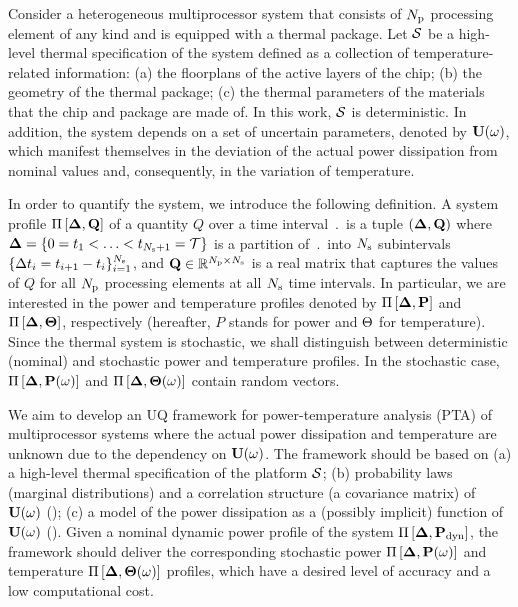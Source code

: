 Consider a heterogeneous multiprocessor system that consists of ${N_\text{p}}$ processing element of any kind and is equipped with a thermal package. Let $\mathcal{S}$ be a high-level thermal specification of the system defined as a collection of temperature-related information: (a) the floorplans of the active layers of the chip; (b) the geometry of the thermal package; (c) the thermal parameters of the materials that the chip and package are made of. In this work, $\mathcal{S}$ is deterministic. In addition, the system depends on a set of uncertain parameters, denoted by $\mathbf{U}(\omega)$, which manifest themselves in the deviation of the actual power dissipation from nominal values and, consequently, in the variation of temperature.

In order to quantify the system, we introduce the following definition. A system profile $\prof{\m{Q}}$ of a quantity $Q$ over a time interval $\period$ is a tuple $(\part, \m{Q})$ where $\boldsymbol{\Delta} = \{ 0 = t_1 < \dotsc < t_{N_\text{s} + 1} = \mathcal{T} \}$ is a partition of $\period$ into $N_\text{s}$ subintervals $\{ \Delta t_i = t_{i+1} - t_i \}_{i = 1}^{N_\text{s}}$, and $\m{Q} \in \real^{\cores \times \steps}$ is a real matrix that captures the values of $Q$ for all ${N_\text{p}}$ processing elements at all $N_\text{s}$ time intervals. In particular, we are interested in the power and temperature profiles denoted by $\prof{\mP}$ and $\Pi\left[\boldsymbol{\Delta}, {\boldsymbol\Theta}\right]$, respectively (hereafter, $P$ stands for power and $\Theta$ for temperature). Since the thermal system is stochastic, we shall distinguish between deterministic (nominal) and stochastic power and temperature profiles. In the stochastic case, $\prof{\mP(\o)}$ and $\Pi\left[\boldsymbol{\Delta}, {\boldsymbol\Theta}(\omega)\right]$ contain random vectors.

We aim to develop an UQ framework for power-temperature analysis (PTA) of multiprocessor systems where the actual power dissipation and temperature are unknown due to the dependency on $\mathbf{U}(\omega)$. The framework should be based on (a) a high-level thermal specification of the platform $\mathcal{S}$; (b) probability laws (marginal distributions) and a correlation structure (a covariance matrix) of $\mathbf{U}(\omega)$ (); (c) a model of the power dissipation as a (possibly implicit) function of $\mathbf{U}(\omega)$ (). Given a nominal dynamic power profile of the system $\prof{\mP_\dyn}$, the framework should deliver the corresponding stochastic power $\Pi\left[\boldsymbol{\Delta}, \mathbf{P}(\omega)\right]$ and temperature $\Pi\left[\boldsymbol{\Delta}, {\boldsymbol\Theta}(\omega)\right]$ profiles, which have a desired level of accuracy and a low computational cost.
